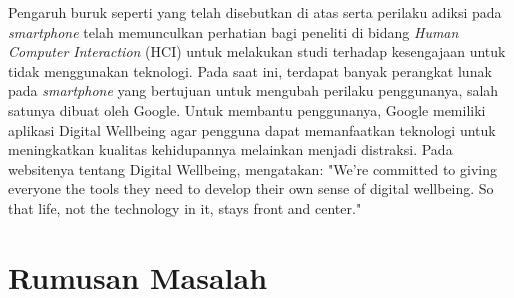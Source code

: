 Pengaruh buruk seperti yang telah disebutkan di atas serta perilaku adiksi pada \textit{smartphone} telah memunculkan perhatian bagi peneliti di bidang \textit{Human Computer Interaction} (HCI) untuk melakukan studi terhadap kesengajaan untuk tidak menggunakan teknologi. Pada saat ini, terdapat banyak perangkat lunak pada \textit{smartphone} yang bertujuan untuk mengubah perilaku penggunanya, salah satunya dibuat oleh Google. \parencite{CHI2019SOCIALIZE} Untuk membantu penggunanya, Google memiliki aplikasi Digital Wellbeing agar pengguna dapat memanfaatkan teknologi untuk meningkatkan kualitas kehidupannya melainkan menjadi distraksi. Pada websitenya tentang Digital Wellbeing, \textcite{google2019digitalwellbeing} mengatakan: "We’re committed to giving everyone the tools they need to develop their own sense of digital wellbeing. So that life, not the technology in it, stays front and center." 



\section{Rumusan Masalah}

